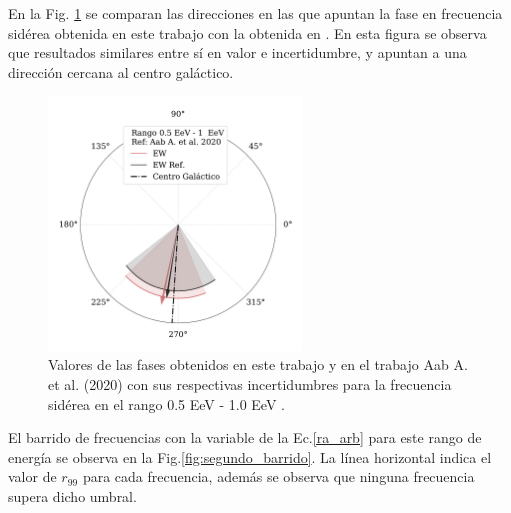     En la Fig. \ref{fig:segundo} se comparan las direcciones en las que apuntan la fase en frecuencia sidérea obtenida en este trabajo con la obtenida en \cite{Aab_2020}. En esta figura se observa que resultados similares entre sí en valor e incertidumbre, y apuntan a una dirección cercana al centro galáctico.

    
    \begin{figure}[H]
        \begin{small}
            \begin{center}
                \includegraphics[width=0.6\textwidth]{phase_segundo_bin_v3.pdf}
                \vspace*{-1 cm}
            \end{center}
            \caption{Valores de las fases obtenidos en este trabajo y en el trabajo Aab A.  et al. (2020) \cite{Aab_2020} con sus respectivas incertidumbres para la frecuencia sidérea en el rango 0.5 EeV - 1.0 EeV .}
            \label{fig:segundo}
        \end{small}
    \end{figure}

    El barrido de frecuencias con la variable de la Ec.\ref{ra_arb} para este rango de energía se observa en la Fig.\ref{fig:segundo_barrido}. La línea horizontal indica el valor de $r_{99}$ para cada frecuencia, además se observa que ninguna frecuencia supera dicho umbral. 

